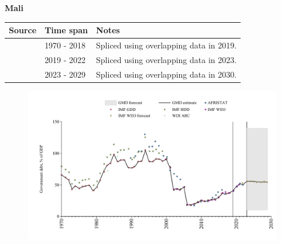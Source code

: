 \documentclass[12pt,a4paper,landscape]{article}
\begin{document}
\begin{adjustbox}{max totalsize={\paperwidth}{\paperheight},center}
\begin{minipage}[t][\textheight][t]{\textwidth}
\vspace*{0.5cm}
{}
\begin{center}
{\Large\bfseries Mali}
\end{center}
\vspace{0.5cm}
\begin{table}[H]
\centering
\small
\begin{tabular}{|l|l|l|}
\hline
\textbf{Source} & \textbf{Time span} & \textbf{Notes} \\
\hline
\rowcolor{white}\cite{IMF_GDD}& 1970 - 2018 &Spliced using overlapping data in 2019.\\
\rowcolor{lightgray}\cite{AFRISTAT}& 2019 - 2022 &Spliced using overlapping data in 2023.\\
\rowcolor{white}\cite{IMF_WEO_forecast}& 2023 - 2029 &Spliced using overlapping data in 2030.\\
\hline
\end{tabular}
\end{table}
\begin{figure}[H]
\centering
\includegraphics[width=\textwidth,height=0.6\textheight,keepaspectratio]{graphs/MLI_govdebt_GDP.pdf}
\end{figure}
\end{minipage}
\end{adjustbox}
\end{document}
